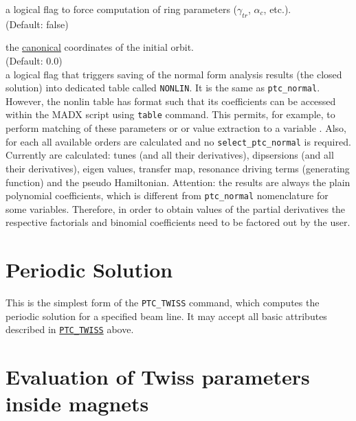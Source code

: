 \begin{madlist}
   a logical flag to force computation of ring
  parameters ($\gamma_{tr}$, $\alpha_c$, etc.). \\ 
  (Default: false)

   the
  \hyperref[subsec:tables-canon]{canonical} coordinates of the initial
  orbit. \\ (Default: 0.0) \\
  
   a logical flag that triggers saving of the normal form analysis results
  (the closed solution) into dedicated table called \texttt{NONLIN}. It is the same as  \texttt{ptc\_normal}.
   However, the nonlin table has format such that its coefficients can be accessed within the MADX script using 
   \texttt{table} command. This permits, for example, to perform matching of these parameters or or value extraction to a variable . 
   Also, for each all available orders are calculated and 
   no \texttt{select\_ptc\_normal} is required.
   Currently are calculated: tunes (and all their derivatives), 
   dipsersions (and all their derivatives), eigen values, transfer map, 
   resonance driving terms (generating function) and the pseudo Hamiltonian.
   Attention: the results are always the plain polynomial coefficients, 
   which is different from  \texttt{ptc\_normal} nomenclature for some variables.
   Therefore, in order to obtain values of the partial derivatives the respective factorials 
   and binomial coefficients need to be factored out by the user. 
   
   

   
  
\end{madlist}


\section{Periodic Solution}
\label{sec:ptc-twiss-periodic}	

This is the simplest form of the \texttt{PTC\_TWISS} command, which
computes the periodic solution for a specified beam line. It may
accept all basic attributes described in
\hyperref[sec:ptc-twiss]{\texttt{PTC\_TWISS}} above. 



\section{Evaluation of Twiss parameters inside magnets}
\label{sec:ptc-twiss-slicing}

